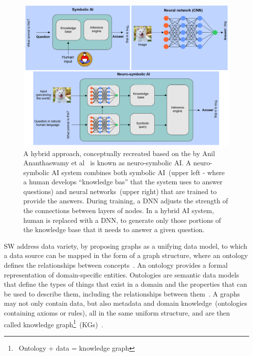 \begin{figure}
	\centering
	\includegraphics[scale=0.9]{images/Capture5.PNG}
	\caption[Symbolic vs. A neuro-symbolic AI]{A hybrid approach, conceptually recreated based on the by Anil Ananthaswamy et al~\cite{AIsnextbigleap} is known as neuro-symbolic AI. A neuro-symbolic AI system combines both symbolic AI~(upper left - where a human develops ``knowledge bas'' that the system uses to answer questions) and neural networks~(upper right) that are trained to provide the answers. During training, a DNN adjusts the strength of the connections between layers of nodes. In a hybrid AI system, human is replaced with a DNN, to generate only those portions of the knowledge base that it needs to answer a given question.}
	\label{fig:neurosymbolic_AI}
	\vspace{-2mm}
\end{figure} 

\hspace*{3.5mm} SW address data variety, by proposing graphs as a unifying data model, to which a data source can be mapped in the form of a graph structure, where an ontology defines the relationships between concepts~\cite{hitzler2009foundations}. An ontology provides a formal representation of domain-specific entities\cite{alirezaie2019semantic}. Ontologies are semantic data models that define the types of things that exist in a domain and the properties that can be used to describe them, including the relationships between them~\cite{hogan2020knowledge}. A graphs may not only contain data, but also metadata and domain knowledge~(ontologies containing axioms or rules), all in the same uniform structure, and are then called knowledge graph\footnote{~Ontology + data = knowledge graph}~(KGs)~\cite{wilcke2017knowledge,hogan2020knowledge}.

